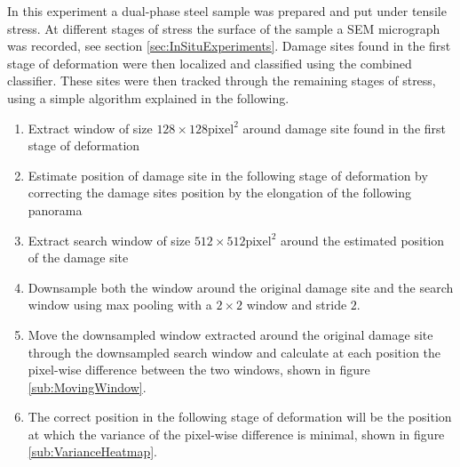 In this experiment a dual-phase steel sample was prepared and put under tensile stress. At different stages of stress the surface of the sample a SEM micrograph was recorded, see section \ref{sec:InSituExperiments}. Damage sites found in the first stage of deformation were then localized and classified using the combined classifier. These sites were then tracked through the remaining stages of stress, using a simple algorithm explained in the following. \\

\begin{enumerate}
\item Extract window of size $128\times 128 \text{pixel}^2$ around damage site found in the first stage of deformation
\item Estimate position of damage site in the following stage of deformation by correcting the damage sites position by the elongation of the following panorama
\item Extract search window of size $512\times 512 \text{pixel}^2$ around the estimated position of the damage site
\item Downsample both the window around the original damage site and the search window using max pooling with a $2\times 2$ window and stride $2$.
\item Move the downsampled window extracted around the original damage site through the downsampled search window and calculate at each position the pixel-wise difference between the two windows, shown in figure \ref{sub:MovingWindow}.
\item The correct position in the following stage of deformation will be the position at which the variance of the pixel-wise difference is minimal, shown in figure \ref{sub:VarianceHeatmap}.
\end{enumerate}


